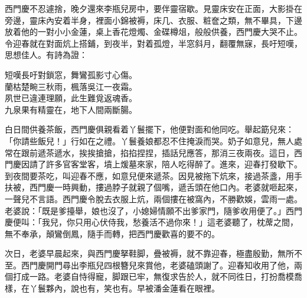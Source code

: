 西門慶不忍遽捨，晚夕還來李瓶兒房中，要伴靈宿歇。見靈床安在正面，大影掛在旁邊，靈床內安着半身，裡面小錦被褥，床几、衣服、粧奩之類，無不畢具，下邊放着他的一對小小金蓮，{}桌上香花燈燭、金碟樽俎，般般供養，西門慶大哭不止。令迎春就在對面炕上搭鋪，到夜半，對着孤燈，半窓斜月，翻覆無寐，長吁短嘆，思想佳人。有詩為證：

\begin{myquote} 
短嘆長吁對鎖窓，舞鸞孤影寸心傷。\\蘭枯楚畹三秋雨，楓落吳江一夜霜。\\夙世已違連理願，此生難覓返魂香。\\九泉果有精靈在，地下人間兩斷腸。
\end{myquote} 

白日間供養茶飯，西門慶俱親看着丫鬟擺下，他便對面和他同吃。舉起筯兒來：「你請些飯兒！」{}行如在之禮。丫鬟養娘都忍不住掩淚而哭。奶子如意兒，無人處常在跟前遞茶遞水，挨挨搶搶，掐掐捏捏，插話兒應答，那消三夜兩夜。{}這日，西門慶因請了許多官客堂客，墳上煖墓來家，陪人吃得醉了。進來，迎春打發歇下。到夜間要茶吃，叫迎春不應，如意兒便來遞茶。因見被拖下炕來，接過茶盞，用手扶被，西門慶一時興動，摟過脖子就親了個嘴，遞舌頭在他口內。老婆就咂起來，一聲兒不言語。西門慶令脫去衣服上炕，兩個摟在被窩內，不勝歡娛，雲雨一處。老婆說：「既是爹擡舉，娘也沒了，小媳婦情願不出爹家門，隨爹收用便了。」西門慶便叫：「我兒，你只用心伏侍我，愁養活不過你來！」這老婆聽了，枕蓆之間，無不奉承，顛鸞倒鳳，隨手而轉，{}把西門慶歡喜的要不的。

次日，老婆早晨起來，與西門慶拏鞋脚，疊被褥，就不靠迎春，極盡殷勤，無所不至。西門慶開門尋出李瓶兒四根簪兒來賞他，老婆磕頭謝了。迎春知收用了他，兩個打成一路。老婆自恃得寵，脚跟已牢，無復求告於人，就不同徃日，打扮喬模喬樣，在丫鬟夥內，說也有，笑也有。{}早被潘金蓮看在眼裡。

